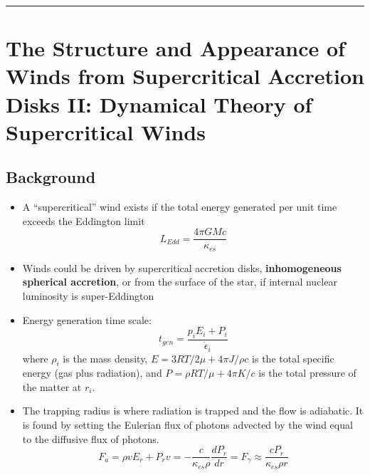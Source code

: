 \documentclass[onecolumn]{aastex63}
\begin{document}

\vspace{1cm}
\hrule
\vspace{1cm}

\section{The Structure and Appearance of Winds from Supercritical Accretion Disks II: Dynamical Theory of Supercritical Winds}
\begin{centering}

\cite{meier1982}

\end{centering}


\subsection{Background}
\begin{itemize}
    \item A ``supercritical'' wind exists if the total energy generated per unit time exceeds the Eddington limit
    \begin{equation}
        L_{Edd} = \frac{4\pi G M c}{\kappa_{es}}
    \end{equation}
    \item Winds could be driven by supercritical accretion disks, \textbf{inhomogeneous spherical accretion}, or from the surface of the star, if internal nuclear luminosity is super-Eddington
    \item Energy generation time scale:
    \begin{equation}
        t_{gen} = \frac{p_iE_i + P_i}{\dot \epsilon_i}
    \end{equation}
    where $\rho_i$ is the mass density, $E = 3RT/2\mu + 4\pi J/\rho c$ is the total specific energy (gas plus radiation), and $P = \rho R T / \mu + 4\pi K / c$ is the total pressure of the matter at $r_i$.
    \item The trapping radius is where radiation is trapped and the flow is adiabatic. It is found by setting the Eulerian flux of photons advected by the wind equal to the diffusive flux of photons.
    \begin{equation}
        F_a = \rho v E_r + P_r v = -\frac{c}{\kappa_{es} \rho}\frac{dP_r}{dr} = F_\gamma \approx \frac{cP_r}{\kappa_{es}\rho r}
    \end{equation}
\end{itemize}
\end{document}
